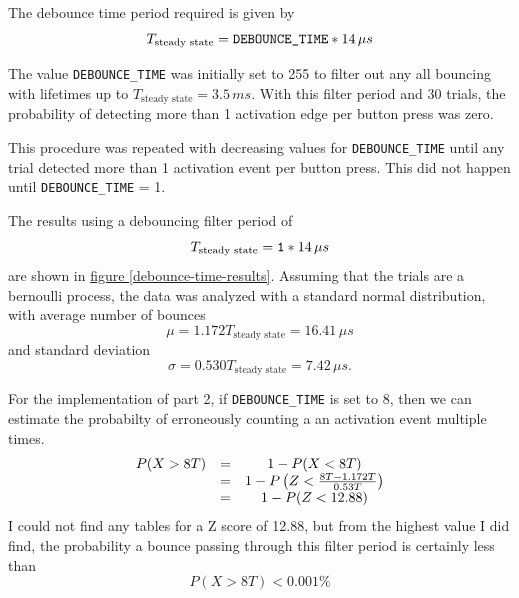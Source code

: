 \documentclass[11pt]{article}
\begin{document}
The debounce time period required is given by
\begin{equation*}
T_{\textrm{steady state}}=\textrm{\texttt{DEBOUNCE\_TIME}}*14\,\mu s
\end{equation*}

The value \texttt{DEBOUNCE\_TIME} was initially set to 255 to filter out any
all bouncing with lifetimes up to $T_{\textrm{steady state}}=3.5\,ms$.
With this filter period and 30 trials, the probability of
detecting more than 1 activation edge per button press was zero.

This procedure was repeated with decreasing values for \texttt{DEBOUNCE\_TIME}
until any trial detected more than 1 activation event per button press.
This did not happen until \texttt{DEBOUNCE\_TIME} = 1.

The results using a debouncing filter period of
\begin{equation*}
T_{\textrm{steady state}}=\textrm{\texttt{1}}*14\,\mu s
\end{equation*}
are shown in \hyperref[debounce-time-results]{figure \ref{debounce-time-results}}.
Assuming that the trials are a bernoulli process, the data was
analyzed with a standard normal distribution, with average number of bounces
\begin{equation*}
\mu=1.172T_{\textrm{steady state}}=16.41\,\mu s
\end{equation*}
and standard deviation
\begin{equation*}
\sigma=0.530T_{\textrm{steady state}}=7.42\,\mu s.
\end{equation*}

For the implementation of part 2, if \texttt{DEBOUNCE\_TIME} is set to 8,
then we can estimate the probabilty of erroneously counting a an activation
event multiple times.
\begin{equation*}
\begin{array}{c c c}
P(X>8T)	&=	&1-P(X<8T)	\\
&=&	1-P\left(Z<\frac{8T-1.172T}{0.53T}\right)	\\
&=&	1-P(Z<12.88)	\\
\end{array}
\end{equation*}
I could not find any tables for a Z score of 12.88, but from the highest
value I did find, the probability a bounce passing through this filter
period is certainly less than
\begin{equation*}
P(X>8T)<0.001\%
\end{equation*}
\end{document}
